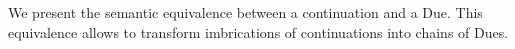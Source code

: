 
We present the semantic equivalence between a continuation and a Due.
This equivalence allows to transform imbrications of continuations into chains of Dues.






